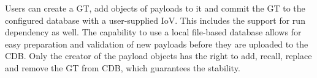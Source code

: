 \begin{comment}
On the users' side, except for just using central database, a local database back-end that takes GT information such as calibration data while uses a local database, such as a customized PID weight file,  is also possible.  It automatically download the needed database files that are required for a BASF2 execution and stores them in a local folder. This means even if the local machine is offline or the CDB is not accessible, one can still run BASF2 as long as the local folder is there. 
\begin{figure}[htbp]
\centering
\texttt{[image: CDB]}
\caption{ Relations of all entities in CDB\cite{BASF2}, showing the management logic from users' end to each CDB files and services. }
\label{fig:CDB}
\end{figure}
\end{comment}
 



\begin{comment}
The management of CBD with the extension of local database gives a good convenience for users to perform their own analysis and share the results with collaborators.
Users' access to conditions objects in the CDB is
provided by two interface classes, one for single objects
called ``DBObjPtr" and one for arrays of objects called
``DBArray". To facilitate easy creation of new conditions data – for example, during calibration – we provide two payload creation classes, ``DBImportObj" and ``DBImportArray". They
have an interface very similar to DBObjPtr and DBArray\cite{BASF2}.
\end{comment}

Users can create a GT, add objects of payloads to it and commit the GT to the configured database with a user-supplied IoV. This includes the support for run dependency as well. The capability to use a local file-based
database allows for easy preparation and validation of new payloads before they are uploaded to the CDB. Only the creator of the payload objects has the right to add, recall, replace and remove the GT from CDB, which guarantees the stability.

\begin{comment}
The scheme of this entities and how users interact with CDB object is demonstrated in Figure \ref{fig:CDB}. For example, user can perform their analysis and first locally generate weight files or calibration data based on different run conditions and reconstruction criteria, which are stated by their names of the IoVs. Once the results are good to share, they can create a GT in CDB of which they have the full ownership, add all database files into the GT and open it to Belle II collaboration. Anyone who would like to re-calibrate data or use their weight files for PID and so on, can simply use the built-in function ``basf2.useCentralDB()" in the BASF2 steering file to directly access the corresponding data. However, only the creator of the CDB objects has the right to add, recall, replace and remove the GT, which guarantees the stability of the CDB and responsibilities for each user.

\end{comment}

